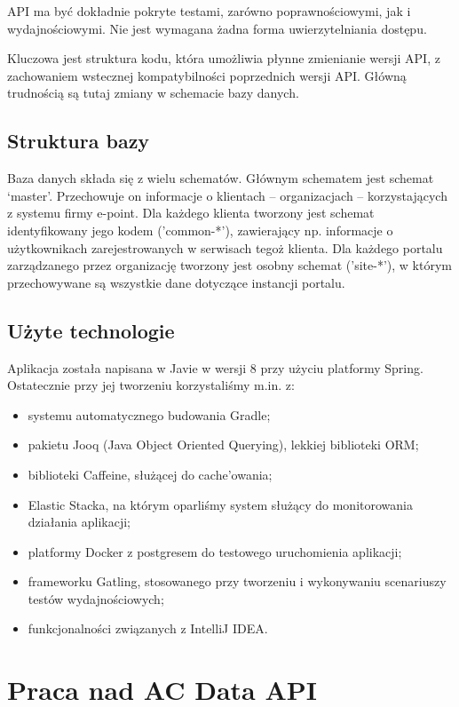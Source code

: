 \documentclass[licencjacka]{pracamgr}
\begin{document}
API ma być dokładnie pokryte testami, zarówno poprawnościowymi, jak i wydajnościowymi. Nie jest wymagana żadna forma uwierzytelniania dostępu.

\vspace{1mm}

Kluczowa jest struktura kodu, która umożliwia płynne  zmienianie wersji API, z zachowaniem wstecznej kompatybilności poprzednich wersji API. Główną trudnością są tutaj zmiany w schemacie bazy danych.

\section{Struktura bazy}

Baza danych składa się z wielu schematów. Głównym schematem jest schemat ‘master’. Przechowuje on informacje o klientach – organizacjach – korzystających z systemu firmy e-point. Dla każdego klienta tworzony jest schemat identyfikowany jego kodem ('common-*'), zawierający np. informacje o użytkownikach zarejestrowanych w serwisach tegoż klienta. Dla każdego portalu zarządzanego przez organizację tworzony jest osobny schemat ('site-*'), w którym przechowywane są wszystkie dane dotyczące instancji portalu.

\section{Użyte technologie}

Aplikacja została napisana w Javie w wersji 8 przy użyciu platformy Spring. Ostatecznie przy jej tworzeniu korzystaliśmy m.in. z:
\begin{itemize}
\item systemu automatycznego budowania Gradle;
\item pakietu Jooq (Java Object Oriented Querying), lekkiej biblioteki ORM;
\item biblioteki Caffeine, służącej do cache’owania;
\item Elastic Stacka, na którym oparliśmy system służący do monitorowania działania aplikacji;
\item platformy Docker z postgresem do testowego uruchomienia aplikacji;
\item frameworku Gatling, stosowanego przy tworzeniu i wykonywaniu scenariuszy testów wydajnościowych;
\item funkcjonalności związanych z IntelliJ IDEA.
\end{itemize}

\chapter{Praca nad AC Data API}
\end{document}

